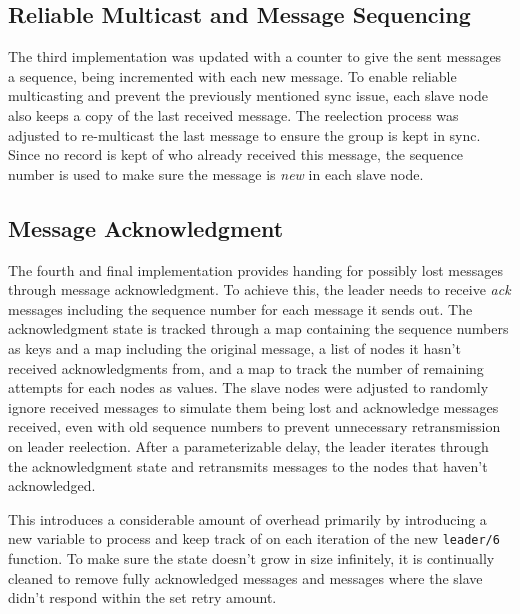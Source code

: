 \documentclass[a4paper, 11pt]{article}
\begin{document}

\subsection{Reliable Multicast and Message Sequencing}

The third implementation was updated with a counter to give the sent messages a sequence, being incremented with each new message.
To enable reliable multicasting and prevent the previously mentioned sync issue, each slave node also keeps a copy of the last received message.
The reelection process was adjusted to re-multicast the last message to ensure the group is kept in sync.
Since no record is kept of who already received this message, the sequence number is used to make sure the message is \textit{new} in each slave node.



\subsection{Message Acknowledgment}

The fourth and final implementation provides handing for possibly lost messages through message acknowledgment.
To achieve this, the leader needs to receive \textit{ack} messages including the sequence number for each message it sends out.
The acknowledgment state is tracked through a map containing the sequence numbers as keys and a map including the original message,
a list of nodes it hasn't received acknowledgments from, and a map to track the number of remaining attempts for each nodes as values.
The slave nodes were adjusted to randomly ignore received messages to simulate them being lost and acknowledge messages received, even with old sequence numbers to prevent unnecessary retransmission on leader reelection.
After a parameterizable delay, the leader iterates through the acknowledgment state and retransmits messages to the nodes that haven't acknowledged.

This introduces a considerable amount of overhead primarily by introducing a new variable to process and keep track of on each iteration of the new \texttt{leader/6} function.
To make sure the state doesn't grow in size infinitely, it is continually cleaned to remove fully acknowledged messages and messages where the slave didn't respond within the set retry amount.
\end{document}

